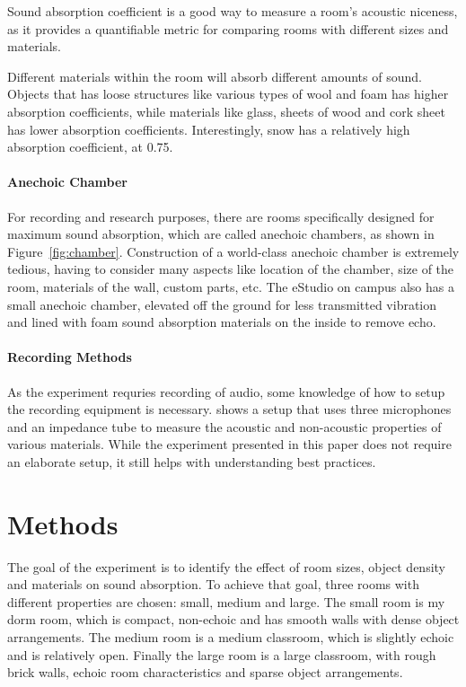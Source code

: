 \documentclass[12pt,onecolumn,letterpaper,draftclsnofoot]{article}
\newcommand{\figref}[1]{Figure~\ref{fig:#1}}
\begin{document}
Sound absorption coefficient is a good way to measure a room's acoustic
niceness, as it provides a quantifiable metric for comparing rooms with
different sizes and materials.

Different materials within the room will absorb different amounts of sound.
Objects that has loose structures like various types of wool and foam has
higher absorption coefficients, while materials like glass, sheets of wood and
cork sheet has lower absorption coefficients. Interestingly, snow has a
relatively high absorption coefficient, at 0.75.

\paragraph{Anechoic Chamber}
For recording and research purposes, there are rooms specifically designed for
maximum sound absorption, which are called anechoic chambers, as shown in
\figref{chamber}. Construction of a world-class anechoic chamber is extremely
tedious, having to consider many aspects like location of the chamber, size of
the room, materials of the wall, custom parts, etc. The eStudio on campus also
has a small anechoic chamber, elevated off the ground for less transmitted
vibration and lined with foam sound absorption materials on the inside to
remove echo.

\paragraph{Recording Methods}
As the experiment requries recording of audio, some knowledge of how to setup
the recording equipment is necessary. \cite{recording} shows a setup that uses
three microphones and an impedance tube to measure the acoustic and
non-acoustic properties of various materials. While the experiment presented
in this paper does not require an elaborate setup, it still helps with
understanding best practices.

\section{Methods}
The goal of the experiment is to identify the effect of room sizes, object
density and materials on sound absorption. To achieve that goal, three rooms
with different properties are chosen: small, medium and large. The small room
is my dorm room, which is compact, non-echoic and has smooth walls with dense
object arrangements. The medium room is a medium classroom, which is slightly
echoic and is relatively open. Finally the large room is a large classroom,
with rough brick walls, echoic room characteristics and sparse object
arrangements.
\end{document}
